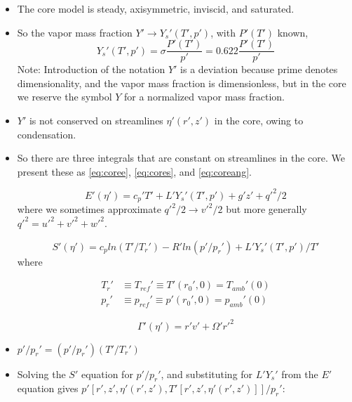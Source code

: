 \documentclass[preprint, prX]{revtex4}
\begin{document}
\begin{itemize}
\item The core model is steady, axisymmetric, inviscid, and saturated.

\item So the vapor mass fraction $Y' \rightarrow Y_s'(T',p')$, with $P'(T')$ known,
\begin{equation}
	Y_s'(T',p') = \sigma \frac{P'(T')}{p'} = 0.622 \frac{P'(T')}{p'}
\end{equation}
Note: Introduction of the notation $Y'$ is a deviation because prime denotes dimensionality, and the vapor mass fraction is dimensionless, but in the core we reserve the symbol $Y$ for a normalized vapor mass fraction.

\item $Y'$ is not conserved on streamlines $\eta'(r',z')$ in the core, owing to condensation.

\item So there are three integrals that are constant on streamlines in the core. We present these as \eqref{eq:coree}, \eqref{eq:cores}, and \eqref{eq:coreang}.

\begin{equation}
E'(\eta') = c_p' T' + L' Y_s'(T',p') + g'z' + q'^2/2
\label{eq:coree}
\end{equation}
where we sometimes approximate $q'^2/2 \rightarrow v'^2/2$ but more generally $q'^2 = u'^2 + v'^2 + w'^2$.

\begin{equation}
	S'(\eta') = c_p ln(T' / T_r') - R' ln(p'/p_r') + L'Y_s'(T',p')/T'
	\label{eq:cores}
\end{equation}
where

\begin{equation}
\begin{split}
	T_r' & \equiv T_{ref}' \equiv T'(r_0', 0) = T_{amb}'(0) \\
	p_r' & \equiv p_{ref}' \equiv p'(r_0', 0) = p_{amb}'(0)
\end{split}	
\end{equation}

\begin{equation}
	\Gamma'(\eta') = r' v' + \Omega'r'^2
	\label{eq:coreang}
\end{equation}

\item $p'/p_r' = (p'/p_r')(T'/T_r')$

\item Solving the $S'$ equation for $p'/p_r'$, and substituting for $L'Y_s'$ from the $E'$ equation gives $p'\left[r',z',\eta'(r',z'), T'[r',z',\eta'(r',z')] \right]/p_r'$:


\end{itemize}
\end{document}
